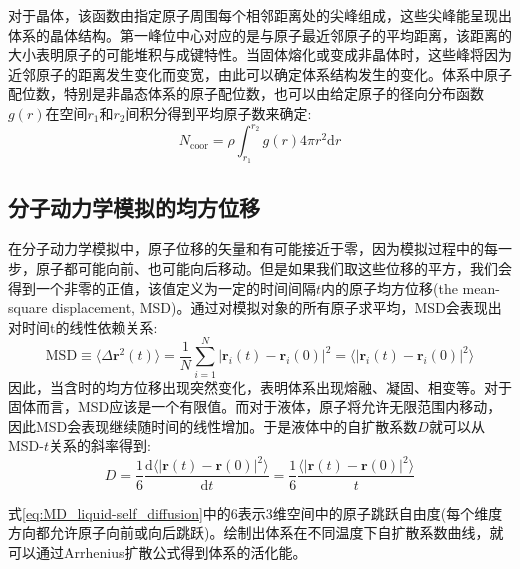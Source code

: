 对于晶体，该函数由指定原子周围每个相邻距离处的尖峰组成，这些尖峰能呈现出体系的晶体结构。第一峰位中心对应的是与原子最近邻原子的平均距离，该距离的大小表明原子的可能堆积与成键特性。当固体熔化或变成非晶体时，这些峰将因为近邻原子的距离发生变化而变宽，由此可以确定体系结构发生的变化。体系中原子配位数，特别是非晶态体系的原子配位数，也可以由给定原子的径向分布函数$g(r)$在空间$r_1$和$r_2$间积分得到平均原子数来确定:
\begin{equation}
	N_{\mathrm{coor}}=\rho\int_{r_1}^{r_2}g(r)4\pi r^2\mathrm{d}r
	\label{eq:MD-N-coop}
\end{equation}

\subsection{分子动力学模拟的均方位移}
在分子动力学模拟中，原子位移的矢量和有可能接近于零，因为模拟过程中的每一步，原子都可能向前、也可能向后移动。但是如果我们取这些位移的平方，我们会得到一个非零的正值，该值定义为一定的时间间隔$t$内的原子均方位移\textrm{(the mean-square displacement, MSD)}。通过对模拟对象的所有原子求平均，\textrm{MSD}会表现出对时间t的线性依赖关系:
\begin{equation}
	\mathrm{MSD}\equiv\langle\Delta\mathbf{r}^2(t)\rangle=\dfrac1N\sum_{i=1}^N|\mathbf{r}_i(t)-\mathbf{r}_i(0)|^2=\big\langle|\mathbf{r}_i(t)-\mathbf{r}_i(0)|^2\big\rangle
	\label{eq:MD_MSD}
\end{equation}
因此，当含时的均方位移出现突然变化，表明体系出现熔融、凝固、相变等。对于固体而言，\textrm{MSD}应该是一个有限值。而对于液体，原子将允许无限范围内移动，因此\textrm{MSD}会表现继续随时间的线性增加。于是液体中的自扩散系数$D$就可以从\textrm{MSD}-$t$关系的斜率得到:
\begin{equation}
	D=\dfrac16\dfrac{\mathrm{d}\langle|\mathbf{r}(t)-\mathbf{r}(0)|^2\rangle}{\mathrm{d}t}=\dfrac16\dfrac{\langle|\mathbf{r}(t)-\mathbf{r}(0)|^2\rangle}{t}
	\label{eq:MD_liquid-self_diffusion}
\end{equation}

式\eqref{eq:MD_liquid-self_diffusion}中的6表示3维空间中的原子跳跃自由度(每个维度方向都允许原子向前或向后跳跃)。绘制出体系在不同温度下自扩散系数曲线，就可以通过\textrm{Arrhenius}扩散公式得到体系的活化能。

